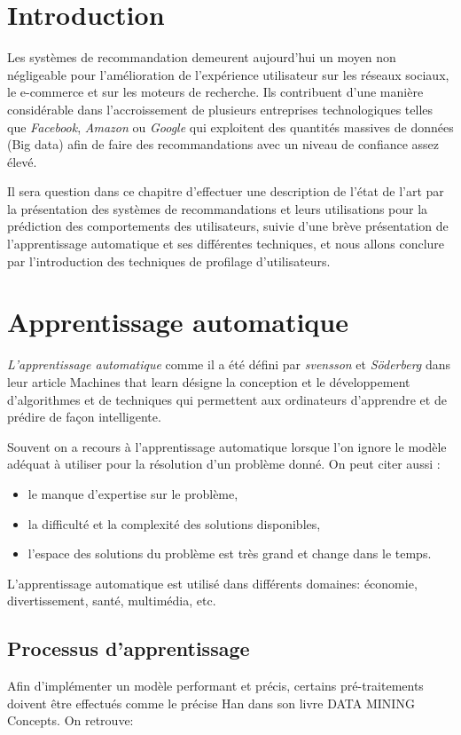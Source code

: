 
\section{Introduction}
Les systèmes de recommandation demeurent aujourd'hui un moyen non négligeable pour l'amélioration de l'expérience utilisateur sur les réseaux sociaux, le e-commerce et sur les moteurs de recherche. Ils contribuent d'une manière considérable dans l'accroissement de plusieurs entreprises technologiques telles que \emph{Facebook}, \emph{Amazon} ou \emph{Google} qui exploitent des quantités massives de données (Big data) afin de faire des recommandations avec un niveau de confiance assez élevé.

Il sera question dans ce chapitre d'effectuer une description de l'état de l'art par la présentation des systèmes de recommandations et leurs utilisations pour la prédiction des comportements des utilisateurs, suivie d'une brève présentation de l'apprentissage automatique et ses différentes techniques, et nous allons conclure par l'introduction des techniques de profilage d'utilisateurs.

\newpage
\section{Apprentissage automatique}
\emph{L'apprentissage automatique} comme il a été défini par \emph{svensson} et \emph{Söderberg} dans leur article \textquotedbl Machines that learn\textquotedbl \cite{svensson} désigne la conception et le développement d'algorithmes et de techniques qui permettent aux ordinateurs d'apprendre et de prédire de façon intelligente.

Souvent on a recours à l'apprentissage automatique lorsque l'on ignore le modèle adéquat à utiliser pour la résolution d'un problème donné. On peut citer aussi :
\begin{itemize}
    \item le manque d'expertise sur le problème,
    \item la difficulté et la complexité des solutions disponibles,
    \item l'espace des solutions du problème est très grand et change dans le temps. 
\end{itemize}
L'apprentissage automatique est utilisé dans différents domaines: économie, divertissement, santé, multimédia, etc.

\subsection{Processus d'apprentissage}
Afin d'implémenter un modèle performant et précis, certains pré-traitements doivent être effectués comme le précise Han dans son livre \textquotedbl DATA MINING Concepts\textquotedbl \cite{Han}. On retrouve:

